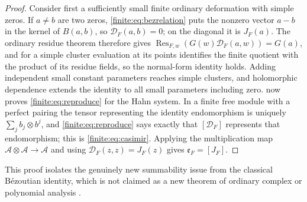 \documentclass[11pt,letterpaper]{article}
\theoremstyle{definition}
\theoremstyle{remark}
\newcommand{\Alg}{\mathcal A}
\newcommand{\Eul}{\mathfrak e}
\DeclareMathOperator{\Res}{Res}
\numberwithin{equation}{section}
\begin{document}
\begin{proof}
Consider first a sufficiently small finite ordinary deformation with simple zeros. If $a\neq b$ are two zeros, \eqref{finite:eq:bezrelation} puts the nonzero vector $a-b$ in the kernel of $B(a,b)$, so $\mathcal D_F(a,b)=0$; on the diagonal it is $J_F(a)$. The ordinary residue theorem therefore gives $\Res_{F,w}(G(w)\mathcal D_F(a,w))=G(a)$, and for a simple cluster evaluation at its points identifies the finite quotient with the product of its residue fields, so the normal-form identity holds. Adding independent small constant parameters reaches simple clusters, and holomorphic dependence extends the identity to all small parameters including zero.  now proves \eqref{finite:eq:reproduce} for the Hahn system. In a finite free module with a perfect pairing the tensor representing the identity endomorphism is uniquely $\sum_jb_j\otimes b^j$, and \eqref{finite:eq:reproduce} says exactly that $[\mathcal D_F]$ represents that endomorphism; this is \eqref{finite:eq:casimir}. Applying the multiplication map $\Alg\otimes\Alg\to\Alg$ and using $\mathcal D_F(z,z)=J_F(z)$ gives $\Eul_F=[J_F]$.
\end{proof}

This proof isolates the genuinely new summability issue from the classical B\'ezoutian identity, which is not claimed as a new theorem of ordinary complex or polynomial analysis \cite{finite:CDS,finite:Cox}.
\end{document}
